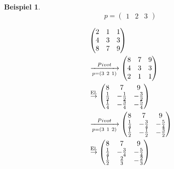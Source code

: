 \documentclass[a4paper,10pt]{article}
\newtheorem[L]{satz}{Satz}[section]
\newtheorem{bsp}{Beispiel}[section]
\newtheorem[S]{beweis}{Beweis}
\newtheorem[S]{beh}{Behauptung}
\begin{document}
\begin{bsp}
  \[
    p = \begin{pmatrix} 1 & 2 & 3 \end{pmatrix}
  \]

  \begin{align*}
    &\begin{pmatrix}
       2 & 1 & 1 \\
       4 & 3 & 3 \\
       8 & 7 & 9
    \end{pmatrix} \\
  &\xrightarrow[p=(3\ 2\ 1)]{Pivot}
    \begin{pmatrix}
       8 & 7 & 9 \\
       4 & 3 & 3 \\
       2 & 1 & 1
    \end{pmatrix} \\
  &\stackrel{\textnormal{El.}}{\rightarrow}
    \begin{pmatrix}
       8 & 7 & 9 \\
       \frac{1}{2} & -\frac{1}{2} & -\frac{3}{2} \\
       \frac{1}{4} & -\frac{3}{4} & -\frac{5}{4}
    \end{pmatrix} \\
  &\xrightarrow[p=(3\ 1\ 2)]{Pivot}
    \begin{pmatrix}
       8 & 7 & 9 \\
       \frac{1}{4} & -\frac{3}{4} & -\frac{5}{4} \\
       \frac{1}{2} & -\frac{1}{2} & -\frac{3}{2}
    \end{pmatrix} \\
  &\stackrel{\textnormal{El.}}{\rightarrow}
    \begin{pmatrix}
       8 & 7 & 9 \\
       \frac{1}{4} & -\frac{3}{4} & -\frac{5}{4} \\
       \frac{1}{2} & \frac{2}{3} & -\frac{2}{3}
    \end{pmatrix}\\
  \end{align*}


\end{bsp}
\end{document}
